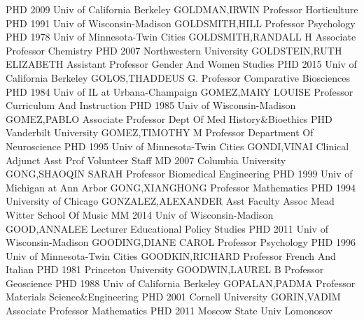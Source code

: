 \documentclass[
]{article}
\begin{document}
\textbar PHD 2009 Univ of California Berkeley \textbar GOLDMAN,IRWIN
\textbar Professor \textbar Horticulture \textbar{} 
\textbar PHD 1991 Univ of Wisconsin-Madison \textbar GOLDSMITH,HILL
\textbar Professor \textbar Psychology \textbar{} 
\textbar PHD 1978 Univ of Minnesota-Twin Cities
\textbar GOLDSMITH,RANDALL H \textbar Associate Professor
\textbar Chemistry \textbar{}  \textbar PHD 2007
Northwestern University \textbar GOLDSTEIN,RUTH ELIZABETH
\textbar Assistant Professor \textbar Gender And Women Studies
\textbar{}  \textbar PHD 2015 Univ of California Berkeley
\textbar GOLOS,THADDEUS G. \textbar Professor \textbar Comparative
Biosciences \textbar{}  \textbar PHD 1984 Univ of IL at
Urbana-Champaign \textbar GOMEZ,MARY LOUISE \textbar Professor
\textbar Curriculum And Instruction \textbar{}  \textbar PHD
1985 Univ of Wisconsin-Madison \textbar GOMEZ,PABLO \textbar Associate
Professor \textbar Dept Of Med History\&Bioethics \textbar{}
 \textbar PHD Vanderbilt University \textbar GOMEZ,TIMOTHY M
\textbar Professor \textbar Department Of Neuroscience \textbar{}
 \textbar PHD 1995 Univ of Minnesota-Twin Cities
\textbar GONDI,VINAI \textbar Clinical Adjunct Asst Prof
\textbar Volunteer Staff \textbar{}  \textbar MD 2007
Columbia University \textbar GONG,SHAOQIN SARAH \textbar Professor
\textbar Biomedical Engineering \textbar{}  \textbar PHD
1999 Univ of Michigan at Ann Arbor \textbar GONG,XIANGHONG
\textbar Professor \textbar Mathematics \textbar{} 
\textbar PHD 1994 University of Chicago \textbar GONZALEZ,ALEXANDER
\textbar Asst Faculty Assoc \textbar Mead Witter School Of Music
\textbar{}  \textbar MM 2014 Univ of Wisconsin-Madison
\textbar GOOD,ANNALEE \textbar Lecturer \textbar Educational Policy
Studies \textbar{}  \textbar PHD 2011 Univ of
Wisconsin-Madison \textbar GOODING,DIANE CAROL \textbar Professor
\textbar Psychology \textbar{}  \textbar PHD 1996 Univ of
Minnesota-Twin Cities \textbar GOODKIN,RICHARD \textbar Professor
\textbar French And Italian \textbar{}  \textbar PHD 1981
Princeton University \textbar GOODWIN,LAUREL B \textbar Professor
\textbar Geoscience \textbar{}  \textbar PHD 1988 Univ of
California Berkeley \textbar GOPALAN,PADMA \textbar Professor
\textbar Materials Science\&Engineering \textbar{} 
\textbar PHD 2001 Cornell University \textbar GORIN,VADIM
\textbar Associate Professor \textbar Mathematics \textbar{}
 \textbar PHD 2011 Moscow State Univ Lomonosov
\end{document}

